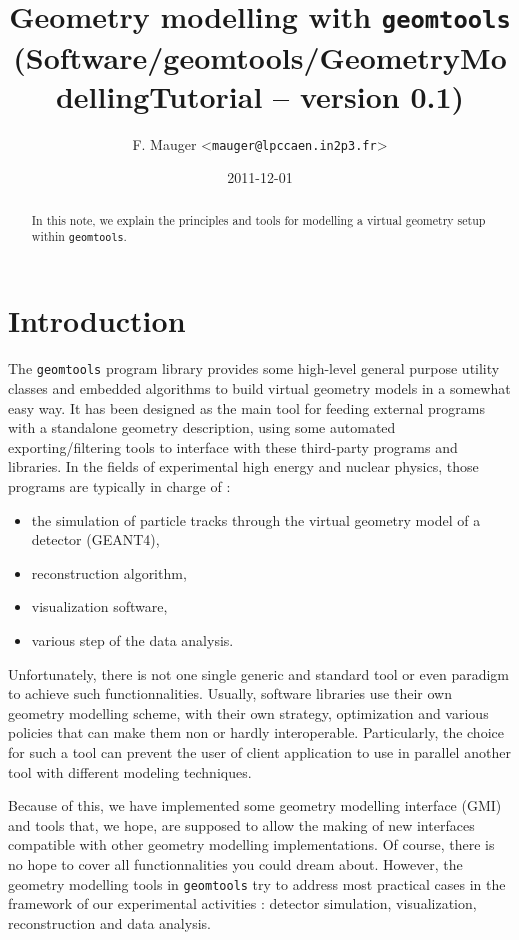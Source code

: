 \documentclass[a4paper,12pt]{article}
\title{Geometry modelling with \texttt{geomtools}\\%
{\small{(Software/geomtools/GeometryModellingTutorial -- version 0.1)}}}
\author{F. Mauger <\texttt{mauger@lpccaen.in2p3.fr}>}
\date{2011-12-01}
\newcommand{\pn}{\par\noindent}
\begin{document}
\maketitle

\begin{abstract}
In this note, we explain the principles and tools
for modelling a virtual geometry setup within \texttt{geomtools}.
\end{abstract}

\tableofcontents

\section{Introduction}

\pn  The \texttt{geomtools} program  library provides  some high-level
general  purpose  utility classes  and  embedded  algorithms to  build
virtual geometry models in a  somewhat easy way.  It has been designed
as  the main  tool for  feeding  external programs  with a  standalone
geometry description, using some automated exporting/filtering tools to
interface with these third-party programs and libraries. In the fields
of experimental  high energy and  nuclear physics, those  programs are
typically in charge of :
\begin{itemize}
\item the simulation of particle tracks through the
virtual  geometry model  of  a  detector  (GEANT4),  
\item reconstruction  algorithm,
\item visualization software,
\item various step of the data analysis. 
\end{itemize}
Unfortunately, there  is not one  single generic and standard  tool or
even  paradigm  to achieve  such  functionnalities. Usually,  software
libraries  use their  own geometry  modelling scheme,  with  their own
strategy, optimization and various policies  that can make them non or
hardly interoperable.   Particularly, the choice  for such a  tool can
prevent the user of client application to use in parallel another tool
with different modeling techniques.

\pn  Because of  this,  we have  implemented  some geometry  modelling
interface (GMI)  and tools  that, we hope,  are supposed to  allow the
making  of new  interfaces  compatible with  other geometry  modelling
implementations.   Of  course,  there   is  no   hope  to   cover  all
functionnalities  you  could   dream  about.   However,  the  geometry
modelling tools  in \texttt{geomtools}  try to address  most practical
cases  in the  framework  of our  experimental  activities :  detector
simulation, visualization, reconstruction and data analysis.
\end{document}
